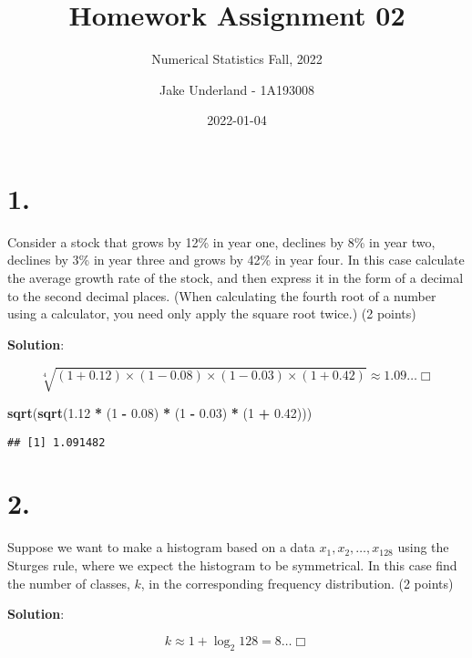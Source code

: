 \documentclass[
]{article}
\title{Homework Assignment 02}
\subtitle{Numerical Statistics Fall, 2022}
\author{Jake Underland - 1A193008}
\date{2022-01-04}
\newenvironment{Shaded}{\begin{snugshade}}{\end{snugshade}}
\newcommand{\DecValTok}[1]{\textcolor[rgb]{0.00,0.00,0.81}{#1}}
\newcommand{\FloatTok}[1]{\textcolor[rgb]{0.00,0.00,0.81}{#1}}
\newcommand{\KeywordTok}[1]{\textcolor[rgb]{0.13,0.29,0.53}{\textbf{#1}}}
\newcommand{\NormalTok}[1]{#1}
\newcommand{\OperatorTok}[1]{\textcolor[rgb]{0.81,0.36,0.00}{\textbf{#1}}}
\newcommand{\StringTok}[1]{\textcolor[rgb]{0.31,0.60,0.02}{#1}}
\begin{document}
\maketitle

\hypertarget{section}{%
\section{1.}\label{section}}

Consider a stock that grows by 12\% in year one, declines by 8\% in year
two, declines by 3\% in year three and grows by 42\% in year four. In
this case calculate the average growth rate of the stock, and then
express it in the form of a decimal to the second decimal places. (When
calculating the fourth root of a number using a calculator, you need
only apply the square root twice.) (2 points)

\textbf{Solution}:

\[\sqrt[4]{(1 + 0.12) \times (1 - 0.08) \times (1 - 0.03) \times (1 + 0.42)} \approx 1.09\dots \Box\]

\begin{Shaded}
\begin{Highlighting}[]
\KeywordTok{sqrt}\NormalTok{(}\KeywordTok{sqrt}\NormalTok{(}\FloatTok{1.12} \OperatorTok{*}\StringTok{ }\NormalTok{(}\DecValTok{1} \OperatorTok{-}\StringTok{ }\FloatTok{0.08}\NormalTok{) }\OperatorTok{*}\StringTok{ }\NormalTok{(}\DecValTok{1} \OperatorTok{-}\StringTok{ }\FloatTok{0.03}\NormalTok{) }\OperatorTok{*}\StringTok{ }\NormalTok{(}\DecValTok{1} \OperatorTok{+}\StringTok{ }\FloatTok{0.42}\NormalTok{)))}
\end{Highlighting}
\end{Shaded}

\begin{verbatim}
## [1] 1.091482
\end{verbatim}

\hypertarget{section-1}{%
\section{2.}\label{section-1}}

Suppose we want to make a histogram based on a data
\(x_1, x_2, \dots, x_{128}\) using the Sturges rule, where we expect the
histogram to be symmetrical. In this case find the number of classes,
\(k\), in the corresponding frequency distribution. (2 points)

\textbf{Solution}:

\[ k \approx 1 + \log_2 128 = 8\dots \Box\]
\end{document}
